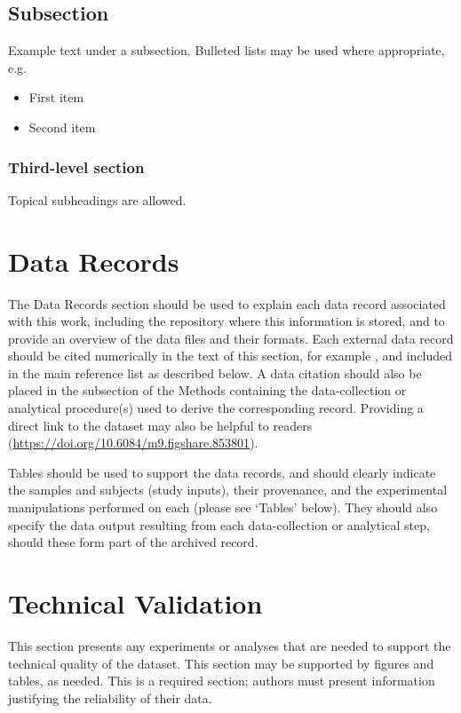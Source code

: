 \documentclass[fleqn,10pt]{wlscirep}
\begin{document}
\subsection*{Subsection}

Example text under a subsection. Bulleted lists may be used where
appropriate, e.g.

\begin{itemize}
\item First item
\item Second item
\end{itemize}

\subsubsection*{Third-level section}

Topical subheadings are allowed.

\section*{Data Records}

The Data Records section should be used to explain each data record
associated with this work, including the repository where this
information is stored, and to provide an overview of the data files and
their formats. Each external data record should be cited numerically in
the text of this section, for example \cite{Hao:gidmaps:2014}, and
included in the main reference list as described below. A data citation
should also be placed in the subsection of the Methods containing the
data-collection or analytical procedure(s) used to derive the
corresponding record. Providing a direct link to the dataset may also be
helpful to readers
(\hyperlink{https://doi.org/10.6084/m9.figshare.853801}{https://doi.org/10.6084/m9.figshare.853801}).

Tables should be used to support the data records, and should clearly
indicate the samples and subjects (study inputs), their provenance, and
the experimental manipulations performed on each (please see `Tables'
below). They should also specify the data output resulting from each
data-collection or analytical step, should these form part of the
archived record.

\section*{Technical Validation}

This section presents any experiments or analyses that are needed to
support the technical quality of the dataset. This section may be
supported by figures and tables, as needed. This is a required section;
authors must present information justifying the reliability of their
data.
\end{document}
